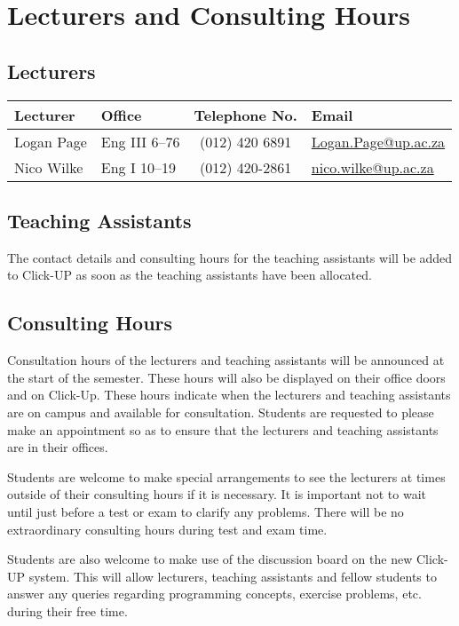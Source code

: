 \section{Lecturers and Consulting Hours}
    \subsection{Lecturers}
        \begin{table}[!h]
            \begin{center}
             \begin{tabular}{|l|l|c|l|}
                 \hline
                 {\bf Lecturer} & {\bf Office} & {\bf Telephone No.} & {\bf Email} \\
                 \hline
                 Logan Page &
                 Eng III 6--76 &
                 (012) 420 6891 &
                 \href{mailto:Logan.Page@up.ac.za}{Logan.Page@up.ac.za} \\
                 Nico Wilke &
                 Eng I 10--19 &
                 (012) 420-2861 &
                 \href{mailto:nico.wilke@up.ac.za}{nico.wilke@up.ac.za} \\
                 \hline
             \end{tabular}
            \end{center}
        \end{table}
    
    \subsection{Teaching Assistants}
        The contact details and consulting hours for the teaching assistants will
        be added to Click-UP as soon as the teaching assistants have been 
        allocated.
    
    \subsection{Consulting Hours}
        Consultation hours of the lecturers and teaching assistants will be 
        announced at the start of the semester. These hours will also be 
        displayed on their office doors and on Click-Up. These hours indicate
        when the lecturers and teaching assistants are on campus and available
        for consultation. Students are requested to please make an appointment
        so as to ensure that the lecturers and teaching assistants are in their
        offices. 
        
        Students are welcome to make special arrangements to see the lecturers at
        times outside of their consulting hours if it is necessary. It is important
        not to wait until just before a test or exam to clarify any problems. 
        There will be no extraordinary consulting hours during test and exam time.
        
        Students are also welcome to make use of the discussion board on the new 
        Click-UP system. This will allow lecturers, teaching assistants and fellow
        students to answer any queries regarding programming concepts,
        exercise problems, etc. during their free time.
